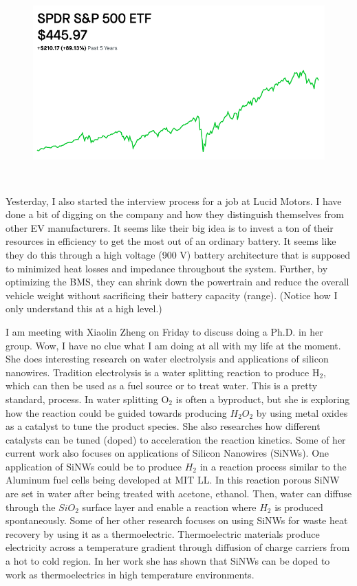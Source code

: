 \documentclass[12pt]{report}
\begin{document}
\begin{figure}[H]
\centering
\includegraphics[height=3in]{images/SPDR500.PNG}
\end{figure}

\par
Yesterday, I also started the interview process for a job at Lucid Motors. I have done a bit of digging on the company and how they distinguish themselves from other EV manufacturers. It seems like their big idea is to invest a ton of their resources in efficiency to get the most out of an ordinary battery. It seems like they do this through a high voltage (900 V) battery architecture that is supposed to minimized heat losses and impedance throughout the system. Further, by optimizing the BMS, they can shrink down the powertrain and reduce the overall vehicle weight without sacrificing their battery capacity (range). (Notice how I only understand this at a high level.)

\par
I am meeting with Xiaolin Zheng on Friday to discuss doing a Ph.D. in her group. Wow, I have no clue what I am doing at all with my life at the moment. She does interesting research on water electrolysis and applications of silicon nanowires. Tradition electrolysis is a water splitting reaction to produce H$_2$, which can then be used as a fuel source or to treat water. This is a pretty standard, process. In water splitting O$_2$ is often a byproduct, but she is exploring how the reaction could be guided towards producing $H_2O_2$ by using metal oxides as a catalyst to tune the product species. She also researches how different catalysts can be tuned (doped) to acceleration the reaction kinetics. Some of her current work also focuses on applications of Silicon Nanowires (SiNWs). One application of SiNWs could be to produce $H_2$ in a reaction process similar to the Aluminum fuel cells being developed at MIT LL. In this reaction porous SiNW are set in water after being treated with acetone, ethanol. Then, water can diffuse through the $SiO_2$ surface layer and enable a reaction where $H_2$ is produced spontaneously. Some of her other research focuses on using SiNWs for waste heat recovery by using it as a thermoelectric. Thermoelectric materials produce electricity across a temperature gradient through diffusion of charge carriers from a hot to cold region. In her work she has shown that SiNWs can be doped to work as thermoelectrics in high temperature environments. 
\end{document}
